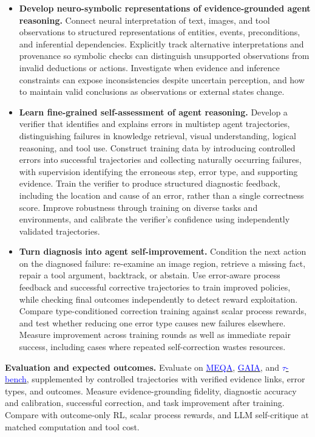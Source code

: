 \documentclass[11pt,letterpaper]{article}
\newcommand{\head}[1]{\textbf{#1}\enspace}
\begin{document}
\begin{itemize}
\item \textbf{Develop neuro-symbolic representations of evidence-grounded agent reasoning.} Connect neural interpretation of text, images, and tool observations to structured representations of entities, events, preconditions, and inferential dependencies. Explicitly track alternative interpretations and provenance so symbolic checks can distinguish unsupported observations from invalid deductions or actions. Investigate when evidence and inference constraints can expose inconsistencies despite uncertain perception, and how to maintain valid conclusions as observations or external states change.
\item \textbf{Learn fine-grained self-assessment of agent reasoning.} Develop a verifier that identifies and explains errors in multistep agent trajectories, distinguishing failures in knowledge retrieval, visual understanding, logical reasoning, and tool use. Construct training data by introducing controlled errors into successful trajectories and collecting naturally occurring failures, with supervision identifying the erroneous step, error type, and supporting evidence. Train the verifier to produce structured diagnostic feedback, including the location and cause of an error, rather than a single correctness score. Improve robustness through training on diverse tasks and environments, and calibrate the verifier's confidence using independently validated trajectories.
\item \textbf{Turn diagnosis into agent self-improvement.} Condition the next action on the diagnosed failure: re-examine an image region, retrieve a missing fact, repair a tool argument, backtrack, or abstain. Use error-aware process feedback and successful corrective trajectories to train improved policies, while checking final outcomes independently to detect reward exploitation. Compare type-conditioned correction training against scalar process rewards, and test whether reducing one error type causes new failures elsewhere. Measure improvement across training rounds as well as immediate repair success, including cases where repeated self-correction wastes resources.
\end{itemize}
\head{Evaluation and expected outcomes.} Evaluate on \href{https://proceedings.neurips.cc/paper_files/paper/2024/hash/e560a0b22e4432003d0dba63ff8dc457-Abstract-Datasets_and_Benchmarks_Track.html}{\textcolor{blue}{MEQA}}, \href{https://arxiv.org/abs/2311.12983}{\textcolor{blue}{GAIA}}, and \href{https://arxiv.org/abs/2406.12045}{\textcolor{blue}{$\tau$-bench}}, supplemented by controlled trajectories with verified evidence links, error types, and outcomes. Measure evidence-grounding fidelity, diagnostic accuracy and calibration, successful correction, and task improvement after training. Compare with outcome-only RL, scalar process rewards, and LLM self-critique at matched computation and tool cost.
\end{document}
